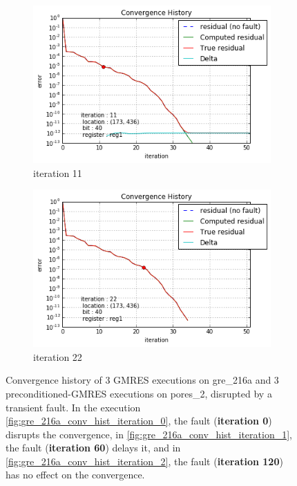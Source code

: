 \begin{figure}[h]
\begin{minipage}[b]{0.48\linewidth}
\begin{subfigure}[t]{\linewidth}
		\centering
		\includegraphics[width=\linewidth]{figures/pores_2/convergence_history_iteration_1.png}
		\caption{iteration 11}\label{fig:pores_2_conv_hist_iteration_1}
	\end{subfigure}
    \quad
    \begin{subfigure}[t]{\linewidth}
		\centering
		\includegraphics[width=\linewidth]{figures/pores_2/convergence_history_iteration_2.png}
		\caption{iteration 22}\label{fig:pores_2_conv_hist_iteration_2}
	\end{subfigure}

    
	\end{minipage}
\caption{Convergence history of 3 GMRES executions on gre_216a and 3 preconditioned-GMRES executions on pores_2, disrupted by a transient fault. In the execution \ref{fig:gre_216a_conv_hist_iteration_0}, the fault (\textbf{iteration 0}) disrupts the convergence, in \ref{fig:gre_216a_conv_hist_iteration_1}, the fault (\textbf{iteration 60}) delays it, and in \ref{fig:gre_216a_conv_hist_iteration_2}, the fault (\textbf{iteration 120}) has no effect on the convergence.}\label{fig:conv_hist_iteration}
\end{figure}




